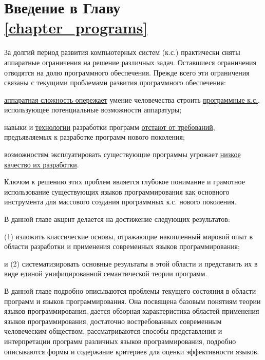 \section*{Введение в Главу \ref{chapter_programs}~}

За долгий период развития компьютерных систем (к.с.) практически сняты аппаратные ограничения на решение различных задач. Оставшиеся ограничения отводятся на долю программного обеспечения. Прежде всего эти ограничения связаны с текущими проблемами развития программного обеспечения:
\begin{textitemize}
    \item \underline{аппаратная сложность опережает} умение человечества строить \underline{программные к.с.}, использующее потенциальные возможности аппаратуры;
    \item навыки и \underline{технологии} разработки программ \underline{отстают от требований}, предъявляемых к разработке программ нового поколения;
    \item возможностям эксплуатировать существующие программы угрожает \underline{низкое качество их разработки}.
\end{textitemize}

Ключом к решению этих проблем является глубокое понимание и грамотное использование существующих языков программирования как основного инструмента для массового создания программных к.с. нового поколения.

В данной главе акцент делается на достижение следующих результатов:
\begin{textitemize}
    \item (1) изложить классические основы, отражающие накопленный мировой опыт в области разработки и применения современных языков программирования;
    \item и (2) систематизировать основные результаты в этой области и представить их в виде единой унифицированной семантической теории программ.
\end{textitemize}

В данной главе подробно описываются проблемы текущего состояния в области программ и языков программирования. Она посвящена базовым понятиям теории языков программирования, дается обзорная характеристика областей применения языков программирования, достаточно востребованных современным человеческим обществом, рассматриваются способы представления и интерпретации программ различных языков программирования, подробно описываются формы и содержание критериев для оценки эффективности языков.

